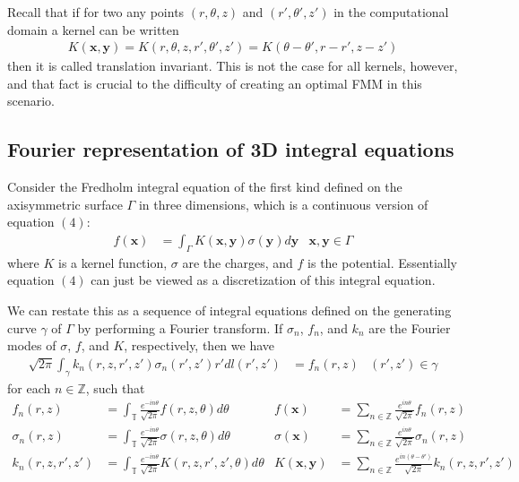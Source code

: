 \documentclass[11pt, oneside]{article}   	%
\begin{document}
Recall that if for two any points $(r,\theta,z)$ and $(r',\theta',z')$ in the computational domain a kernel can be written
\begin{align}
K(\mathbf{x},\mathbf{y}) = K(r,\theta,z,r',\theta',z')=K(\theta-\theta',r-r',z-z')
\end{align}
then it is called translation invariant. This is not the case for all kernels, however, and that fact is crucial to the difficulty of creating an optimal FMM in this scenario.

\subsection{Fourier representation of 3D integral equations}

Consider the Fredholm integral equation of the first kind defined on the axisymmetric surface $\Gamma$ in three dimensions, which is a continuous version of equation $(4)$:
\begin{align}
f(\mathbf{x}) &= \int_\Gamma K(\mathbf{x},\mathbf{y})\sigma(\mathbf{y})d\mathbf{y} &\mathbf{x},\mathbf{y}\in\Gamma
\end{align}
where $K$ is a kernel function, $\sigma$ are the charges, and $f$ is the potential. Essentially equation $(4)$ can just be viewed as a discretization of this integral equation.

We can restate this as a sequence of integral equations defined on the generating curve $\gamma$ of $\Gamma$ by performing a Fourier transform. If $\sigma_n$, $f_n$, and $k_n$ are the Fourier modes of $\sigma$, $f$, and $K$, respectively, then we have
\begin{align}
\sqrt{2\pi}\int_\gamma k_n(r,z,r',z')\sigma_n(r',z')r'dl(r',z')&=f_n(r,z) &(r',z')\in\gamma
\end{align}
for each $n\in\mathbb{Z}$, such that
\begin{align}
f_n(r,z)&=\int_\mathbb{T}\frac{e^{-in\theta}}{\sqrt{2\pi}}f(r,z,\theta)d\theta&f(\mathbf{x})&=\sum_{n\in\mathbb{Z}}\frac{e^{in\theta}}{\sqrt{2\pi}}f_n(r,z)\\
\sigma_n(r,z)&=\int_\mathbb{T}\frac{e^{-in\theta}}{\sqrt{2\pi}}\sigma(r,z,\theta)d\theta&\sigma(\mathbf{x})&=\sum_{n\in\mathbb{Z}}\frac{e^{in\theta}}{\sqrt{2\pi}}\sigma_n(r,z)\\
k_n(r,z,r',z')&=\int_\mathbb{T}\frac{e^{-in\theta}}{\sqrt{2\pi}}K(r,z,r',z',\theta)d\theta&K(\mathbf{x},\mathbf{y})&=\sum_{n\in\mathbb{Z}}\frac{e^{in(\theta-\theta')}}{\sqrt{2\pi}}k_n(r,z,r',z')
\end{align}
\end{document}
